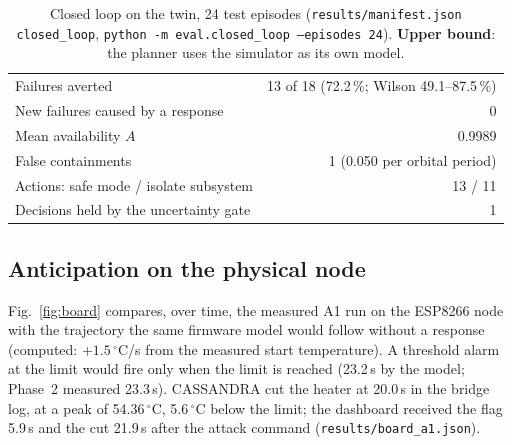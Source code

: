 \documentclass[10pt,a4paper]{article}
\newcommand{\file}[1]{\texttt{#1}}
\newcommand{\degC}{$^{\circ}$C}
\begin{document}
\begin{table}[ht]
\centering
\caption{Closed loop on the twin, 24 test episodes (\file{results/manifest.json} \texttt{closed\_loop},
\texttt{python -m eval.closed\_loop --episodes 24}). \textbf{Upper bound}: the planner uses the
simulator as its own model.}
\label{tab:closed}
\small
\begin{tabular}{@{}lr@{}}
\toprule
Failures averted & 13 of 18 (72.2\,\%; Wilson 49.1--87.5\,\%) \\
New failures caused by a response & 0 \\
Mean availability $A$ & 0.9989 \\
False containments & 1 (0.050 per orbital period) \\
Actions: safe mode / isolate subsystem & 13 / 11 \\
Decisions held by the uncertainty gate & 1 \\
\bottomrule
\end{tabular}
\end{table}

\subsection{Anticipation on the physical node}
Fig.~\ref{fig:board} compares, over time, the measured A1 run on the ESP8266 node with the trajectory
the same firmware model would follow without a response (computed: $+1.5$\,\degC/s from the measured
start temperature). A threshold alarm at the limit would fire only when the limit is reached
(23.2\,s by the model; Phase~2 measured 23.3\,s). CASSANDRA cut the heater at 20.0\,s in the bridge log, at a
peak of 54.36\,\degC, 5.6\,\degC{} below the limit; the dashboard received the flag 5.9\,s and the cut
21.9\,s after the attack command (\file{results/board\_a1.json}).
\end{document}
